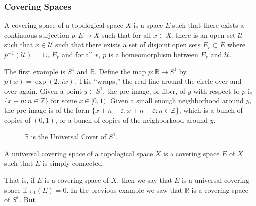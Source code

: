        \subsubsection{Covering Spaces}
            \begin{definition}
                A covering space of a topological space $X$ is a space $E$ such
                that there exists a continuous surjection $p:E\rightarrow{X}$
                such that for all $x\in{X}$, there is an open set $\mathcal{U}$
                such that $x\in\mathcal{U}$ such that there exists a set of
                disjoint open sets $E_{r}\subset{E}$ where
                $p^{-1}(\mathcal{U})=\cup_{r}E_{r}$ and for all $r$, $p$ is a
                homeomorphism between $E_{r}$ and $\mathcal{U}$.
            \end{definition}
            \begin{example}
                The first example is $S^{1}$ and $\mathbb{R}$. Define the map
                $p:\mathbb{R}\rightarrow{S^{1}}$ by $p(x)=\exp(2\pi{i}x)$. This
                ``wraps,'' the real line around the circle over and over again.
                Given a point $y\in{S^{1}}$, the pre-image, or fiber, of $y$
                with respect to $p$ is $\{x+n:n\in\mathbb{Z}\}$ for some
                $x\in[0,1)$. Given a small enough neighborhood around $y$, the
                pre-image is of the form
                $\{x+n-\varepsilon,x+n+\varepsilon:n\in\mathbb{Z}\}$,
                which is a bunch of copies of $(0,1)$, or a bunch
                of copies of the neighborhood around $y$.
            \end{example}
            \begin{figure}[H]
                \centering
                \captionsetup{type=figure}
                
                \caption{$\mathbb{R}$ is the Universal Cover of $S^{1}$.}
                \label{fig:Reals_Cover_Circle}
            \end{figure}
            \begin{definition}
                A universal covering space of a topological space $X$
                is a covering space $E$ of $X$ such that
                $E$ is simply connected.
            \end{definition}
            That is, if $E$ is a covering space of $X$, then we say
            that $E$ is a universal covering space if
            $\pi_{1}(E)=0$. In the previous example we saw that
            $\mathbb{R}$ is a covering space of $S^{1}$. But
